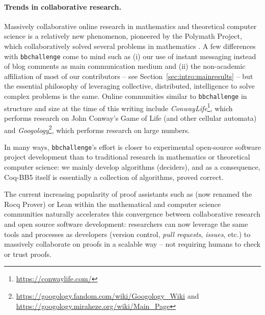 \documentclass[sigconf,screen]{acmart}
\theoremstyle{definition} %
\numberwithin{equation}{section}
\theoremstyle{definition} %
\newcommand{\CoqBB}{Coq-BB5\xspace}
\begin{document}
\paragraph{Trends in collaborative research.} Massively collaborative online research in mathematics and theoretical computer science is a relatively new phenomenon, pioneered by the Polymath Project, which collaboratively solved several problems in mathematics \cite{Gowers2009}. A few differences with \texttt{bbchallenge} come to mind such as (i) our use of instant messaging instead of blog comments as main communication medium and (ii) the non-academic affiliation of most of our contributors -- see Section~\ref{sec:intro:mainresults} -- but the essential philosophy of leveraging collective, distributed, intelligence to solve complex problems is the same. Online communities similar to \texttt{bbchallenge} in structure and size at the time of this writing include \textit{ConwayLife}\footnote{\url{https://conwaylife.com/}}, which performs research on John Conway's Game of Life (and other cellular automata) and \textit{Googology}\footnote{\url{https://googology.fandom.com/wiki/Googology_Wiki} and \url{https://googology.miraheze.org/wiki/Main_Page}}, which performs research on large numbers.

In many ways, \texttt{bbchallenge}'s effort is closer to experimental open-source software project development than to traditional research in mathematics or theoretical computer science: we mainly develop algorithms (deciders), and as a consequence, \CoqBB itself is essentially a collection of algorithms, proved correct.

The current increasing popularity of proof assistants such as \Coq (now renamed the Rocq Prover) or Lean within the mathematical and computer science communities naturally accelerates this convergence between collaborative research and open source software development: researchers can now leverage the same tools and processes as developers (version control, \textit{pull requests}, \textit{issues}, etc.) to massively collaborate on proofs in a scalable way -- \ie not requiring humans to check or trust proofs.
\end{document}
